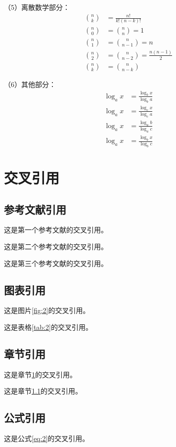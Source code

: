 \begin{ujnbody}
    （5）离散数学部分：
    \begin{equation}
        \begin{split}
            \binom{n}{k} &= \frac{n!}{k!(n-k)!} \\
            \binom{n}{0} &= \binom{n}{n} = 1 \\
            \binom{n}{1} &= \binom{n}{n-1} = n \\
            \binom{n}{2} &= \binom{n}{n-2} = \frac{n(n-1)}{2} \\
            \binom{n}{k} &= \binom{n}{n-k}
        \end{split}
    \end{equation}

    （6）其他部分：
    \begin{equation}
        \begin{split}
            \log_a x &= \frac{\log_b x}{\log_b a} \\
            \log_a x &= \frac{\log_c x}{\log_c a} \\
            \log_a x &= \frac{\log_a b}{\log_a c} \\
            \log_a x &= \frac{\log_b x}{\log_b c}
        \end{split}
    \end{equation}
    \section{交叉引用}\label{sec:3}
    \subsection{参考文献引用}\label{sec:4}
    这是第一个参考文献的交叉引用\cite{shannon1948mathematical}。

    这是第二个参考文献的交叉引用\cite{nash1996non}。

    这是第三个参考文献的交叉引用\cite{turing2009computing}。
    \subsection{图表引用}
    这是图片\ref{fig:2}的交叉引用。

    这是表格\ref{tab:2}的交叉引用。
    \subsection{章节引用}
    这是章节\ref{sec:3}的交叉引用。

    这是章节\ref{sec:4}的交叉引用。
    \subsection{公式引用}
    这是公式\ref{eq:2}的交叉引用。
\end{ujnbody}
